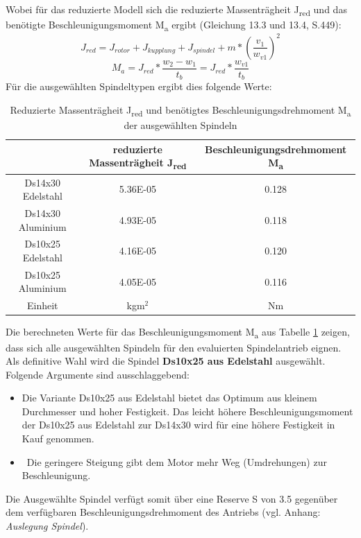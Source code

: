Wobei für das reduzierte Modell sich die reduzierte Massenträgheit J\textsubscript{red} und das benötigte Beschleunigungsmoment M\textsubscript{a} ergibt (Gleichung 13.3 und 13.4, S.449):
\begin{equation}
J_{red}=J_{rotor}+J_{kupplung}+J_{spindel}+m*(\frac{v_{1}}{w_{v1}})^{2}
\end{equation}
\begin{equation}
M_{a}=J_{red}*\frac{w_{2}-w_{1}}{t_{b}}=J_{red}*\frac{w_{v1}}{t_{b}}
\end{equation}
Für die ausgewählten Spindeltypen ergibt dies folgende Werte:

\begin{table}[H]
\begin{tabular}{|c|c|c|}
	\hline 
	& reduzierte Massenträgheit J\textsubscript{red}& Beschleunigungsdrehmoment M\textsubscript{a}\\ 
	\hline 
	Ds14x30 Edelstahl & 5.36E-05 & 0.128 \\ 
	\hline 
	Ds14x30 Aluminium & 4.93E-05 & 0.118 \\ 
	\hline 
	Ds10x25 Edelstahl & 4.16E-05 & 0.120 \\ 
	\hline 
	Ds10x25 Aluminium & 4.05E-05 & 0.116 \\ 
	\hline 
	Einheit & kgm$^2$ & Nm \\ 
	\hline 
\end{tabular} 
\caption{Reduzierte Massenträgheit J\textsubscript{red} und benötigtes Beschleunigungsdrehmoment M\textsubscript{a} der ausgewählten Spindeln}
\label{tab:spindel_final}
\end{table}
Die berechneten Werte für das Beschleunigungsmoment M\textsubscript{a} aus Tabelle \ref{tab:spindel_final} zeigen, dass sich alle ausgewählten Spindeln für den evaluierten Spindelantrieb eignen.
\newline
Als definitive Wahl wird die Spindel \textbf{Ds10x25 aus Edelstahl} ausgewählt. Folgende Argumente sind ausschlaggebend:
	\begin{itemize}
	\item Die Variante Ds10x25 aus Edelstahl bietet das Optimum aus kleinem Durchmesser und hoher Festigkeit. Das leicht höhere Beschleunigungsmoment der Ds10x25 aus Edelstahl zur Ds14x30 wird für eine höhere Festigkeit in Kauf genommen.
	
	\item \ Die geringere Steigung gibt dem Motor mehr Weg (Umdrehungen) zur Beschleunigung.
\end{itemize}
Die Ausgewählte Spindel verfügt somit über eine Reserve S von 3.5 gegenüber dem verfügbaren Beschleunigungsdrehmoment des Antriebs (vgl. Anhang: \textit{Auslegung Spindel}).

